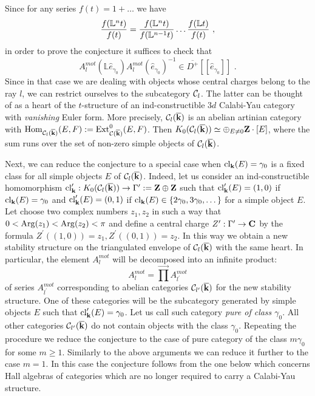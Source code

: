 \documentclass[12pt]{article}
\begin{document}
Since for any series $f(t)=1+\dots$ we have
$${f({\mathbb L}^nt)\over{f(t)}}={f({\mathbb L}^nt)\over{f({\mathbb L}^{n-1}t)}}\dots{f({\mathbb L}t)\over{f(t)}}\,\,,$$
in order to prove the conjecture it suffices to check that 
$$  A_l^{mot}({\mathbb L} \hat{e}_{\gamma_0})A_l^{mot}(\hat{e}_{\gamma_0})^{-1}\in \overline{D^+}[[\hat{e}_{\gamma_0}]]\,\,.$$
Since in that case we are dealing with objects whose central charges belong to the ray $l$, we can restrict ourselves to the subcategory ${\mathcal C}_l$. The latter can be thought of as a heart of the $t$-structure of an ind-constructible $3d$ Calabi-Yau category with  {\it vanishing} Euler form. More precisely, ${\mathcal C}_l({\overline{\bf k}})$ is an abelian artinian category with
$\operatorname{Hom}_{{\mathcal C}_l({\overline{\bf k}})}(E,F):=\operatorname{Ext}^0_{{\mathcal C}({\overline{\bf k}})}(E,F)$. Then $K_0({\mathcal C}_l({\overline{\bf k}}))\simeq \oplus_{E\ne 0}{\bf Z}\cdot[E]$, where the sum runs over the set of non-zero simple objects of  ${\mathcal C}_l({\overline{\bf k}})$.

Next, we can reduce the conjecture to a special case when $\operatorname{cl}_{{\bf k}}(E)=\gamma_0$ is a fixed class for all simple objects $E$ of ${\mathcal C}_l({\overline{\bf k}})$. Indeed, let us consider an ind-constructible homomorphism $\operatorname{cl}_{{\bf k}}^{\prime}:K_0({\mathcal C}_l({\overline{\bf k}}))\to \Gamma^{\prime}:={\bf Z}\oplus {\bf Z}$ such that $\operatorname{cl}_{{\bf k}}^{\prime}(E)=(1,0)$ if
$\operatorname{cl}_{{\bf k}}(E)=\gamma_0$ and $\operatorname{cl}_{{\bf k}}^{\prime}(E)=(0,1)$ if $\operatorname{cl}_{{\bf k}}(E)\in \{2\gamma_0,3\gamma_0,\dots\}$ for a simple object $E$. Let choose two complex numbers $z_1,z_2$ in such a way that $0<\operatorname{Arg}(z_1)<\operatorname{Arg}(z_2)<\pi$ and define a central charge $Z^{\prime}:\Gamma^{\prime}\to {\bf C}$  by the formula $Z^{\prime}((1,0))=z_1, Z^{\prime}((0,1))=z_2$. In this way we obtain a new stability structure on the triangulated envelope of ${\mathcal C}_l({\overline{\bf k}})$ with the same heart. In particular, the element $A_l^{mot}$ will be decomposed into an infinite product:
$$A_l^{mot}=\prod^{\longrightarrow}A_{l^{\prime}}^{mot}$$
of series $A_{l^\prime}^{mot}$ corresponding to abelian categories ${\mathcal C}_{l^{\prime}}({\overline{\bf k}})$ for the new stability structure. One of these categories will be the subcategory generated by  simple objects $E$ such that $\operatorname{cl}_{{\bf k}}^{\prime}(E)=\gamma_0$. Let us call such category {\it pure of class $\gamma_0$}. All other categories ${\mathcal C}_{l^{\prime}}({\overline{\bf k}})$ do not contain objects with the class $\gamma_0$. Repeating the procedure we reduce the conjecture to the case of pure category of the class $m\gamma_0$ for some $m\geqslant 1$. Similarly to the above arguments we can reduce it further to the case $m=1$. In this case the conjecture follows from the one below which concerns Hall algebras of categories which are no longer required to carry a Calabi-Yau structure.
\end{document}
